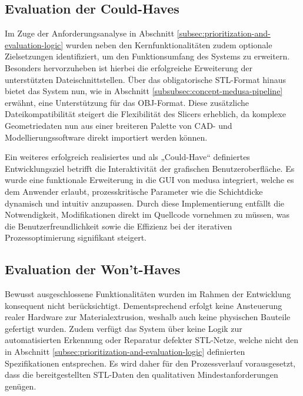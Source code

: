     \subsection{Evaluation der Could-Haves}\label{subsec:evaluation-could-haves}
      Im Zuge der Anforderungsanalyse in Abschnitt \ref{subsec:prioritization-and-evaluation-logic} wurden neben den Kernfunktionalitäten zudem optionale Zielsetzungen identifiziert, um den Funktionsumfang des Systems zu erweitern.
      Besonders hervorzuheben ist hierbei die erfolgreiche Erweiterung der unterstützten Dateischnittstellen. Über das obligatorische \ac{STL}-Format hinaus bietet das System nun, wie in Abschnitt \ref{subsubsec:concept-medusa-pipeline} erwähnt, eine Unterstützung für das \ac{OBJ}-Format.
      Diese zusätzliche Dateikompatibilität steigert die Flexibilität des Slicers erheblich, da komplexe Geometriedaten nun aus einer breiteren Palette von \ac{CAD}- und Modellierungssoftware direkt importiert werden können.

      Ein weiteres erfolgreich realisiertes und als „Could-Have“ definiertes Entwicklungsziel betrifft die Interaktivität der grafischen Benutzeroberfläche.
      Es wurde eine funktionale Erweiterung in die \ac{GUI} von \ac{medusa} integriert, welche es dem Anwender erlaubt, prozesskritische Parameter wie die Schichtdicke dynamisch und intuitiv anzupassen.
      Durch diese Implementierung entfällt die Notwendigkeit, Modifikationen direkt im Quellcode vornehmen zu müssen, was die Benutzerfreundlichkeit sowie die Effizienz bei der iterativen Prozessoptimierung signifikant steigert.

    \subsection{Evaluation der Won’t-Haves}\label{subsec:evaluation-wont-haves}
      Bewusst ausgeschlossene Funktionalitäten wurden im Rahmen der Entwicklung konsequent nicht berücksichtigt.
      Dementsprechend erfolgt keine Ansteuerung realer Hardware zur Materialextrusion, weshalb auch keine physischen Bauteile gefertigt wurden.
      Zudem verfügt das System über keine Logik zur automatisierten Erkennung oder Reparatur defekter \ac{STL}-Netze, welche nicht den in Abschnitt \ref{subsec:prioritization-and-evaluation-logic} definierten Spezifikationen entsprechen.
      Es wird daher für den Prozessverlauf vorausgesetzt, dass die bereitgestellten \ac{STL}-Daten den qualitativen Mindestanforderungen genügen.


